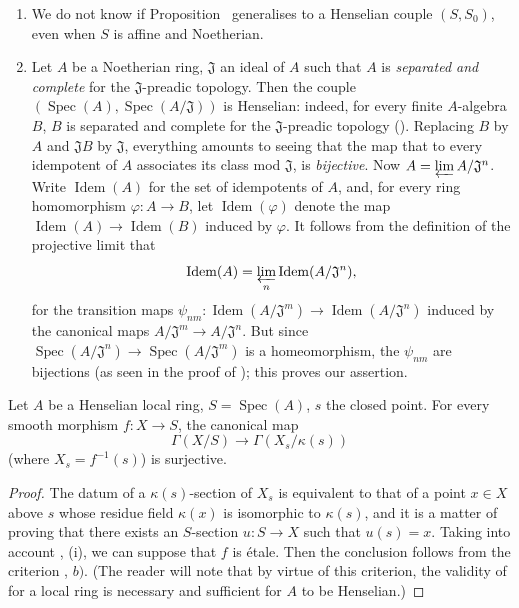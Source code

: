 \begin{remarks}[18.5.16]
\label{IV.18.5.16}
\begin{enumerate}
  \item[(i)] We do not know if Proposition~ generalises to a Henselian couple $(S,S_0)$, even when $S$ is affine and Noetherian.
  \item[(ii)] Let $A$ be a Noetherian ring, $\mathfrak{J}$ an ideal of $A$ such that $A$ is \emph{separated and complete} for the $\mathfrak{J}$-preadic topology.
Then the couple $(\operatorname{Spec}(A),\operatorname{Spec}(A/\mathfrak{J}))$ is Henselian:
indeed, for every finite $A$-algebra $B$, $B$ is separated and complete for the $\mathfrak{J}$-preadic topology ().
Replacing $B$ by $A$ and $\mathfrak{J}B$ by $\mathfrak{J}$, everything amounts to seeing that the map that to every idempotent of $A$ associates its class mod $\mathfrak{J}$, is \emph{bijective}.
Now $A=\varprojlim A/\mathfrak{J}^n$.
Write $\operatorname{Idem}(A)$ for the set of idempotents of $A$, and, for every ring homomorphism $\varphi:A\to B$, let $\operatorname{Idem}(\varphi)$ denote the map $\operatorname{Idem}(A)\to\operatorname{Idem}(B)$ induced by $\varphi$.
It follows from the definition of the projective limit that
\[
\operatorname{Idem}(A)=\varprojlim_n\operatorname{Idem}(A/\mathfrak{J}^n),
\]
for the transition maps $\psi_{nm}:\operatorname{Idem}(A/\mathfrak{J}^m)\to\operatorname{Idem}(A/\mathfrak{J}^n)$ induced by the canonical maps $A/\mathfrak{J}^m\to A/\mathfrak{J}^n$.
But since $\operatorname{Spec}(A/\mathfrak{J}^n)\to\operatorname{Spec}(A/\mathfrak{J}^m)$ is a homeomorphism, the $\psi_{nm}$ are bijections (as seen in the proof of );
this proves our assertion.
\end{enumerate}
\end{remarks}

\begin{theorem}[18.5.17]
\label{IV.18.5.17}
Let $A$ be a Henselian local ring, $S=\operatorname{Spec}(A)$, $s$ the closed point.
For every smooth morphism $f:X\to S$, the canonical map
\[
\Gamma(X/S)\to\Gamma(X_s/\kappa(s))
\]
(where $X_s=f^{-1}(s)$) is surjective.
\end{theorem}

\begin{proof}
The datum of a $\kappa(s)$-section of $X_s$ is equivalent to that of a point $x\in X$ above $s$ whose residue field $\kappa(x)$ is isomorphic to $\kappa(s)$, and it is a matter of proving that there exists an $S$-section $u:S\to X$ such that $u(s)=x$.
Taking into account , (i), we can suppose that $f$ is \'etale.
Then the conclusion follows from the criterion , $b)$.
(The reader will note that by virtue of this criterion, the validity of  for a local ring is necessary and sufficient for $A$ to be Henselian.)
\end{proof}

